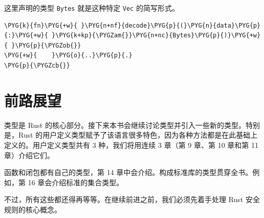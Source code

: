这里声明的类型 \texttt{Bytes} 就是这种特定 \texttt{Vec} 的简写形式。

\begin{Verbatim}[commandchars=\\\{\},breaklines=true,breakanywhere=true,fontsize=\codefont,xleftmargin=17bp]
\PYG{k}{fn}\PYG{+w}{ }\PYG{n+nf}{decode}\PYG{p}{(}\PYG{n}{data}\PYG{p}{:}\PYG{+w}{ }\PYG{k+kp}{\PYGZam{}}\PYG{n+nc}{Bytes}\PYG{p}{)}\PYG{+w}{ }\PYG{p}{\PYGZob{}}
\PYG{+w}{    }\PYG{o}{..}\PYG{p}{.}
\PYG{p}{\PYGZcb{}}
\end{Verbatim}

\section{前路展望}

类型是 Rust 的核心部分。接下来本书会继续讨论类型并引入一些新的类型。特别是，Rust 的用户定义类型赋予了该语言很多特色，因为各种方法都是在此基础上定义的。用户定义类型共有 3 种，我们将用连续 3 章（第 9 章、第 10 章和第 11 章）介绍它们。

函数和闭包都有自己的类型，第 14 章中会介绍。构成标准库的类型贯穿全书。例如，第 16 章会介绍标准的集合类型。

不过，所有这些都还得再等等。在继续前进之前，我们必须先着手处理 Rust 安全规则的核心概念。

